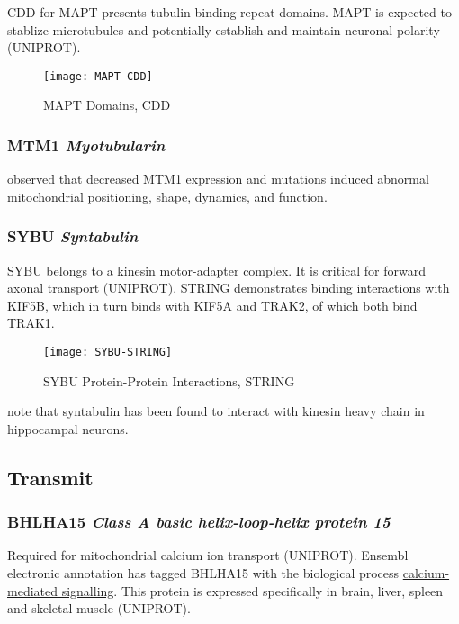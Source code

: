 CDD for MAPT presents tubulin binding repeat domains. MAPT is expected to
stablize microtubules and potentially establish and maintain neuronal polarity
(UNIPROT).

\begin{figure}[h]
  \texttt{[image: MAPT-CDD]}
  \caption{MAPT Domains, CDD}
\end{figure}

\subsubsection{MTM1 \textit{Myotubularin}}

\cite{Hnia2011} observed that decreased MTM1 expression and mutations
induced abnormal mitochondrial positioning, shape, dynamics, and function.

\subsubsection{SYBU \textit{Syntabulin}}

SYBU belongs to a kinesin motor-adapter complex. It is critical for forward
axonal transport (UNIPROT). STRING demonstrates binding interactions with
KIF5B, which in turn binds with KIF5A and TRAK2, of which both bind TRAK1.

\begin{figure}[h]
  \centering
  \texttt{[image: SYBU-STRING]}
  \caption{SYBU Protein-Protein Interactions, STRING}
\end{figure}

\cite{Reis2009} note that syntabulin has been found to interact with kinesin
heavy chain in hippocampal neurons.

\subsection{Transmit}

\subsubsection{BHLHA15 \textit{Class A basic helix-loop-helix protein 15}}

Required for mitochondrial calcium ion transport (UNIPROT). Ensembl electronic
annotation has tagged BHLHA15 with the biological process
\href{http://www.ebi.ac.uk/QuickGO/GTerm?id=GO:0019722}{calcium-mediated
signalling}. This protein is expressed specifically in brain, liver,
spleen and skeletal muscle (UNIPROT).

